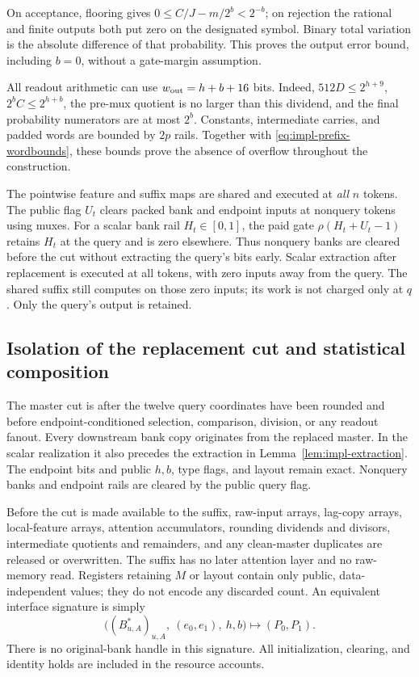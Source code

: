 On acceptance, flooring gives
$0\le C/J-m/2^b<2^{-b}$; on rejection the rational and finite outputs
both put zero on the designated symbol. Binary total variation is the
absolute difference of that probability. This proves the output error
bound, including $b=0$, without a gate-margin assumption.

All readout arithmetic can use $w_{\rm out}=h+b+16$ bits. Indeed,
$512D\le2^{h+9}$, $2^bC\le2^{h+b}$, the pre-mux quotient is no larger
than this dividend, and the final probability numerators are at most
$2^b$. Constants, intermediate carries, and padded words are bounded by
$2p$ rails. Together with \eqref{eq:impl-prefix-wordbounds}, these bounds
prove the absence of overflow throughout the construction.

The pointwise feature and suffix maps are shared and executed at
\emph{all} $n$ tokens. The public flag $U_t$ clears packed bank and endpoint
inputs at nonquery tokens using muxes. For a scalar bank rail
$H_t\in[0,1]$, the paid gate $\rho(H_t+U_t-1)$ retains $H_t$ at the
query and is zero elsewhere. Thus nonquery banks are cleared before the
cut without extracting the query's bits early. Scalar extraction after
replacement is executed at all tokens, with zero inputs away from the
query. The shared suffix still computes on those zero inputs; its work
is not charged only at $q$. Only the query's output is retained.

\subsection{Isolation of the replacement cut and statistical composition}
\label{sec:impl-cut}

The master cut is after the twelve query coordinates have been rounded
and before endpoint-conditioned selection, comparison, division, or any
readout fanout. Every downstream bank copy originates from the replaced
master. In the scalar realization it also precedes the extraction in
Lemma~\ref{lem:impl-extraction}. The endpoint bits and public
$h,b$, type flags, and layout remain exact. Nonquery banks and endpoint
rails are cleared by the public query flag.

Before the cut is made available to the suffix, raw-input arrays, lag-copy
arrays, local-feature arrays, attention accumulators, rounding dividends
and divisors, intermediate quotients and remainders, and any clean-master
duplicates are released or overwritten. The suffix has no later attention
layer and no raw-memory read. Registers retaining $M$ or layout contain
only public, data-independent values; they do not encode any discarded
count. An equivalent interface signature is simply
\[
 \bigl((B^*_{u,A})_{u,A},\ (e_0,e_1),\ h,b\bigr)
       \longmapsto (P_0,P_1).
\]
There is no original-bank handle in this signature. All initialization,
clearing, and identity holds are included in the resource accounts.

